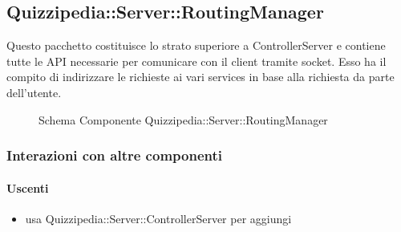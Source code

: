 \subsection{Quizzipedia::Server::RoutingManager}
Questo pacchetto costituisce lo strato superiore a ControllerServer e contiene tutte le API necessarie per comunicare con il client tramite socket. Esso ha il compito di indirizzare le richieste ai vari services in base alla richiesta da parte dell'utente.
\begin{figure}[H]
\centering
\noindent{}
\caption[Schema Componente Quizzipedia::Server::RoutingManager]{Schema Componente Quizzipedia::Server::RoutingManager}
\end{figure}
\subsubsection{Interazioni con altre componenti}
\paragraph{Uscenti}
\begin{itemize}
\item usa Quizzipedia::Server::ControllerServer per aggiungi
\end{itemize}
